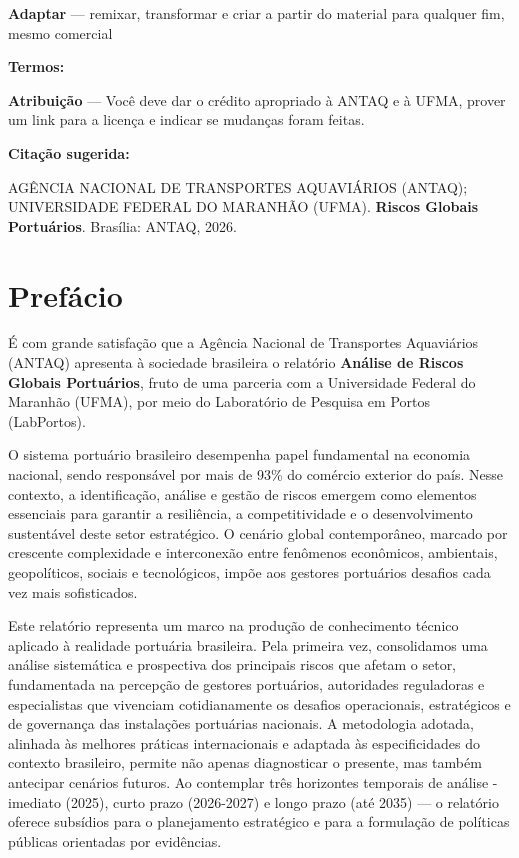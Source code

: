 \documentclass[
  portuguese,
  letterpaper,
  DIV=11,
  numbers=noendperiod]{scrreprt}
\begin{document}
\textbf{Adaptar} --- remixar, transformar e criar a partir do material
para qualquer fim, mesmo comercial

\textbf{Termos:}

\textbf{Atribuição} --- Você deve dar o crédito apropriado à ANTAQ e à
UFMA, prover um link para a licença e indicar se mudanças foram feitas.

\textbf{Citação sugerida:}

AGÊNCIA NACIONAL DE TRANSPORTES AQUAVIÁRIOS (ANTAQ); UNIVERSIDADE
FEDERAL DO MARANHÃO (UFMA). \textbf{Riscos Globais Portuários}.
Brasília: ANTAQ, 2026.


\chapter{Prefácio}\label{prefuxe1cio}

É com grande satisfação que a Agência Nacional de Transportes
Aquaviários (ANTAQ) apresenta à sociedade brasileira o relatório
\textbf{Análise de Riscos Globais Portuários}, fruto de uma parceria com
a Universidade Federal do Maranhão (UFMA), por meio do Laboratório de
Pesquisa em Portos (LabPortos).

O sistema portuário brasileiro desempenha papel fundamental na economia
nacional, sendo responsável por mais de 93\% do comércio exterior do
país. Nesse contexto, a identificação, análise e gestão de riscos
emergem como elementos essenciais para garantir a resiliência, a
competitividade e o desenvolvimento sustentável deste setor estratégico.
O cenário global contemporâneo, marcado por crescente complexidade e
interconexão entre fenômenos econômicos, ambientais, geopolíticos,
sociais e tecnológicos, impõe aos gestores portuários desafios cada vez
mais sofisticados.

Este relatório representa um marco na produção de conhecimento técnico
aplicado à realidade portuária brasileira. Pela primeira vez,
consolidamos uma análise sistemática e prospectiva dos principais riscos
que afetam o setor, fundamentada na percepção de gestores portuários,
autoridades reguladoras e especialistas que vivenciam cotidianamente os
desafios operacionais, estratégicos e de governança das instalações
portuárias nacionais. A metodologia adotada, alinhada às melhores
práticas internacionais e adaptada às especificidades do contexto
brasileiro, permite não apenas diagnosticar o presente, mas também
antecipar cenários futuros. Ao contemplar três horizontes temporais de
análise - imediato (2025), curto prazo (2026-2027) e longo prazo (até
2035) --- o relatório oferece subsídios para o planejamento estratégico
e para a formulação de políticas públicas orientadas por evidências.
\end{document}
